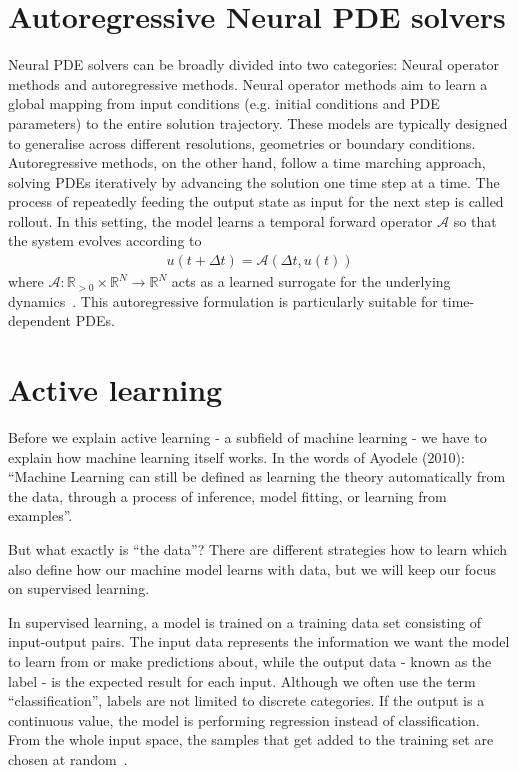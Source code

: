 \section{Autoregressive Neural PDE solvers}
Neural PDE solvers can be broadly divided into two categories: Neural operator methods and autoregressive methods. Neural operator methods aim to learn a global mapping from input conditions (e.g. initial conditions and PDE parameters) to the entire solution trajectory. These models are typically designed to generalise across different resolutions, geometries or boundary conditions. Autoregressive methods, on the other hand, follow a time marching approach, solving PDEs iteratively by advancing the solution one time step at a time. The process of repeatedly feeding the output state as input for the next step is called rollout. In this setting, the model learns a temporal forward operator $\mathcal{A}$ so that the system evolves according to 
\begin{align}
    u(t+\Delta t)=\mathcal{A}(\Delta t, u(t))
\end{align}   
where $\mathcal{A}:\mathbb{R}_{>0}\times\mathbb{R}^N\rightarrow\mathbb{R}^N$ acts as a learned surrogate for the underlying dynamics~\cite{brandstetter2022message}. This autoregressive formulation is particularly suitable for time-dependent PDEs.
\section{Active learning}
Before we explain active learning - a subfield of machine learning - 
we have to explain how machine learning itself works. In the words of Ayodele (2010): ``Machine
Learning can still be defined as learning the theory automatically from the data,
through a process of inference, model fitting, or learning from examples''.

But what exactly is ``the data''? There are different strategies how to learn which also define how our machine model 
learns with data, but we will keep our focus on supervised learning. 

In supervised learning, a model is trained on a training data set consisting of input-output pairs. 
The input data represents the information we want the model to learn from or make predictions about, 
while the output data - known as the label - is the expected result for each input.
Although we often use the term ``classification'', labels are not limited to discrete categories. 
If the output is a continuous value, the model is performing regression instead of classification.
From the whole input space, the samples that get added to the training set are chosen at random~\cite{ayodele2010machine}.

